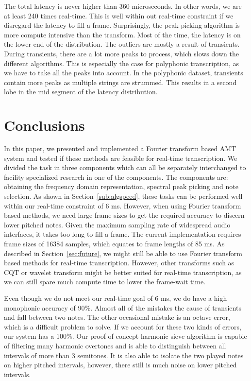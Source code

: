 \documentclass[10pt,twocolumn]{article}
\begin{document}
The total latency is never higher than 360 microseconds. In other words, we are at least 240 times real-time. This is well within out real-time constraint if we disregard the latency to fill a frame. Surprisingly, the peak picking algorithm is more compute intensive than the transform. Most of the time, the latency is on the lower end of the distribution. The outliers are mostly a result of transients. During transients, there are a lot more peaks to process, which slows down the different algorithms. This is especially the case for polyphonic transcription, as we have to take all the peaks into account. In the polyphonic dataset, transients contain more peaks as multiple strings are strummed. This results in a second lobe in the mid segment of the latency distribution.


\section{Conclusions}
In this paper, we presented and implemented a Fourier transform based AMT system and tested if these methods are feasible for real-time transcription. We divided the task in three components which can all be separately interchanged to facility specialized research in one of the components. The components are: obtaining the frequency domain representation, spectral peak picking and note selection. As shown in Section~\ref{sub:algspeed}, these tasks can be performed well within our real-time constraint of 6 ms. However, when using Fourier transform based methods, we need large frame sizes to get the required accuracy to discern lower pitched notes. Given the maximum sampling rate of widespread audio interfaces, it takes too long to fill a frame. The current implementation requires frame sizes of 16384 samples, which equates to frame lengths of 85 ms. As described in Section~\ref{sec:future}, we might still be able to use Fourier transform based methods for real-time transcription. However, other transforms such as CQT or wavelet transform might be better suited for real-time transcription, as we can still spare much compute time to lower the frame-wait time.

Even though we do not meet our real-time goal of 6 ms, we do have a high monophonic accuracy of 90\%. Almost all of the mistakes the cause of transients and fall between two notes. The other occasional mistake is an octave error, which is a difficult problem to solve. If we account for these two kinds of errors, our system has a 100\%. Our proof-of-concept harmonic sieve algorithm is capable of filtering many harmonic overtones and is able to distinguish between all intervals of more than 3 semitones. It is also able to isolate the two played notes on higher pitched intervals, however, there still is much noise on lower pitched intervals.
\end{document}
